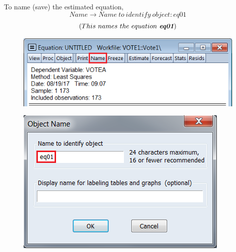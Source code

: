 \documentclass[12pt]{report}
\begin{document}
\noindent To name (save) the estimated equation,
$$Name \to Name\ to\ identify\ object: eq01$$
$$(This\ names\ the\ equation\ \textit{\textbf{eq01}})$$
\begin{figure}[H]
	\centering
	\includegraphics{q1_2}
\end{figure}
\vspace{-\baselineskip}
\begin{figure}[H]
	\centering
	\includegraphics{q1_3}
\end{figure}
\vspace{-\baselineskip}
\end{document}
